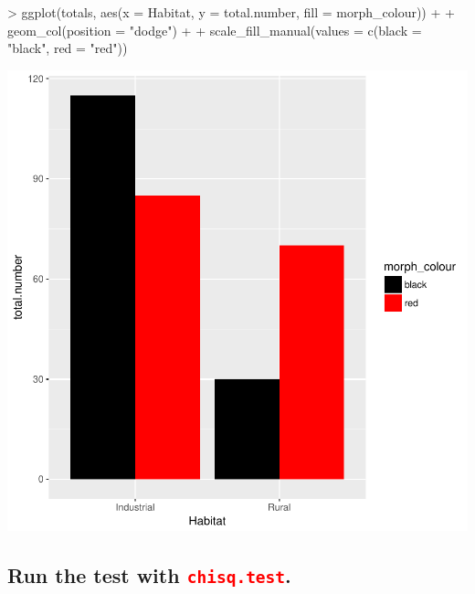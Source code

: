 \documentclass[a4paper,12pt]{article}
\newcommand\code[1]{\textcolor{red}{\texttt{#1}}}
\begin{document}
\begin{shaded}
\begin{Schunk}
\begin{Sinput}
> ggplot(totals, aes(x = Habitat, y = total.number, fill = morph_colour)) +
+   geom_col(position = "dodge") +
+   scale_fill_manual(values = c(black = "black", red = "red"))
\end{Sinput}
\end{Schunk}
\includegraphics{1_Stats_Course_Notes-knitr-008}
\end{shaded}

\subsection{Run the test with \code{chisq.test}.}
\end{document}
